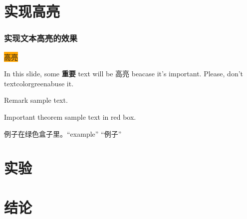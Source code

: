\documentclass{beamer}
\begin{document}
\section{实现高亮}
\begin{frame}
\frametitle{实现文本高亮的效果}
\colorbox{orange}{高亮}

In this slide, some \textbf{重要} text will be \alert{高亮} beacase it's important. 
Please, don't textcolor{green}{abuse} it.

\begin{block}{Remark}
	sample text.
\end{block}

\begin{alertblock}{Important theorem}
	sample text in red box.
\end{alertblock}

\begin{examples}
	例子在绿色盒子里。``example'' “例子”
\end{examples}

\end{frame}



\section{实验}
\section{结论}
\end{document}
